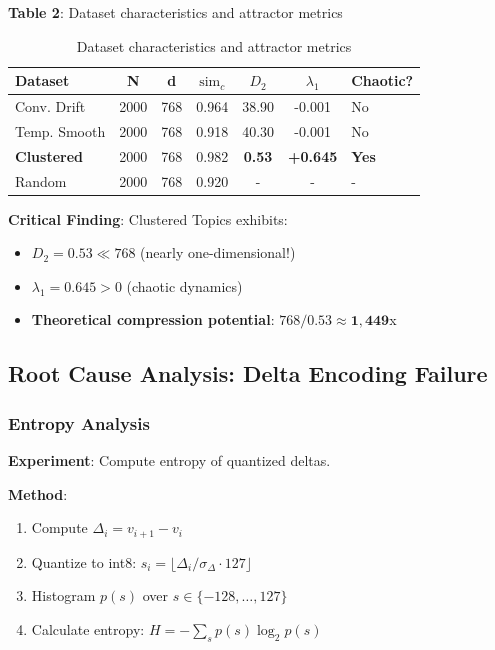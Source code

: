 \documentclass[11pt,a4paper]{article}
\begin{document}
\textbf{Table 2}: Dataset characteristics and attractor metrics

\begin{table}[h]
\centering
\small
\begin{tabular}{@{}lcccccl@{}}
\toprule
\textbf{Dataset} & \textbf{N} & \textbf{d} & \textbf{$\text{sim}_c$} & \textbf{$D_2$} & \textbf{$\lambda_1$} & \textbf{Chaotic?} \\
\midrule
Conv. Drift & 2000 & 768 & 0.964 & 38.90 & -0.001 & No \\
Temp. Smooth & 2000 & 768 & 0.918 & 40.30 & -0.001 & No \\
\textbf{Clustered} & 2000 & 768 & 0.982 & \textbf{0.53} & \textbf{+0.645} & \textbf{Yes} \\
Random & 2000 & 768 & 0.920 & - & - & - \\
\bottomrule
\end{tabular}
\caption{Dataset characteristics and attractor metrics}
\end{table}

\textbf{Critical Finding}: Clustered Topics exhibits:
\begin{itemize}
\item $D_2 = 0.53 \ll 768$ (nearly one-dimensional!)
\item $\lambda_1 = 0.645 > 0$ (chaotic dynamics)
\item \textbf{Theoretical compression potential}: $768/0.53 \approx \mathbf{1,449}$x
\end{itemize}

\subsection{Root Cause Analysis: Delta Encoding Failure}

\subsubsection{Entropy Analysis}

\textbf{Experiment}: Compute entropy of quantized deltas.

\textbf{Method}:
\begin{enumerate}
\item Compute $\Delta_i = v_{i+1} - v_i$
\item Quantize to int8: $s_i = \lfloor \Delta_i / \sigma_\Delta \cdot 127 \rfloor$
\item Histogram $p(s)$ over $s \in \{-128, \ldots, 127\}$
\item Calculate entropy: $H = -\sum_s p(s) \log_2 p(s)$
\end{enumerate}
\end{document}
